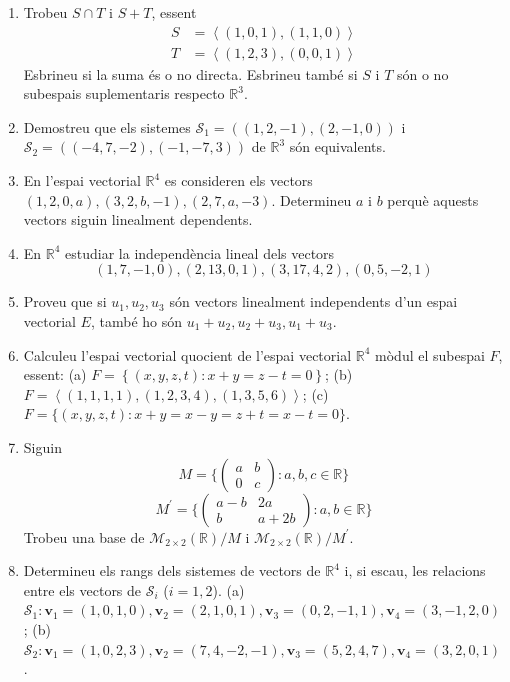 \begin{enumerate}
\item Trobeu $S\cap T$ i $S+T$, essent%
\begin{align*}
S &=\left\langle (1,0,1),(1,1,0)\right\rangle  \\
T &=\left\langle (1,2,3),(0,0,1)\right\rangle 
\end{align*}%
Esbrineu si la suma és o no directa. Esbrineu també si $S$
i $T$ són o no subespais suplementaris respecto $\mathbb{R}^{3}$.

\item Demostreu que els sistemes $\mathcal{S}_{1}=((1,2,-1),(2,-1,0))$ i $%
\mathcal{S}_{2}=((-4,7,-2),(-1,-7,3))$ de $\mathbb{R}^{3}$ són equivalents.

\item En l’espai vectorial $\mathbb{R}^{4}$ es consideren els vectors $%
(1,2,0,a),(3,2,b,-1),(2,7,a,-3)$. Determineu $a$ i $b$ perquè aquests
vectors siguin linealment dependents.

\item En $\mathbb{R}^{4}$ estudiar la independència lineal dels vectors 
\[
(1,7,-1,0),(2,13,0,1),(3,17,4,2),(0,5,-2,1)
\]

\item Proveu que si $u_{1},u_{2},u_{3}$ són vectors linealment
independents d’un espai vectorial $E$, també ho són $%
u_{1}+u_{2},u_{2}+u_{3},u_{1}+u_{3}$.

\item Calculeu l’espai vectorial quocient de l’espai vectorial $\mathbb{R%
}^{4}$ mòdul el subespai $F$, essent: (a) $F%
=\left\{ (x,y,z,t):x+y=z-t=0\right\} $; (b) $F=\left\langle
(1,1,1,1),(1,2,3,4),(1,3,5,6)\right\rangle $; (c) $F%
=\{(x,y,z,t):x+y=x-y=z+t=x-t=0\}$.

\item Siguin 
\[
M=\{\left( 
\begin{array}{cc}
a & b \\ 
0 & c%
\end{array}%
\right) :a,b,c\in \mathbb{R}\}
\]%
\[
M^{\prime }=\{\left( 
\begin{array}{cc}
a-b & 2a \\ 
b & a+2b%
\end{array}%
\right) :a,b\in \mathbb{R}\}
\]%
Trobeu una base de $\mathcal{M}_{2\times 2}(\mathbb{R})/M$ i $\mathcal{M}%
_{2\times 2}(\mathbb{R})/M^{\prime }$.

\item Determineu els rangs dels sistemes de vectors de $\mathbb{R}^{4}$ i, si escau,
les relacions entre els vectors de $\mathcal{S}_{i}$ ($i=1,2$). (a) $%
\mathcal{S}_{1}:\mathbf{v}_{1}=(1,0,1,0),\mathbf{v}_{2}=(2,1,0,1),\mathbf{v}%
_{3}=(0,2,-1,1),\mathbf{v}_{4}=(3,-1,2,0)$; (b) $\mathcal{S}_{2}:\mathbf{v}%
_{1}=(1,0,2,3),\mathbf{v}_{2}=(7,4,-2,-1),\mathbf{v}_{3}=(5,2,4,7),\mathbf{v}%
_{4}=(3,2,0,1)$.


\end{enumerate}
